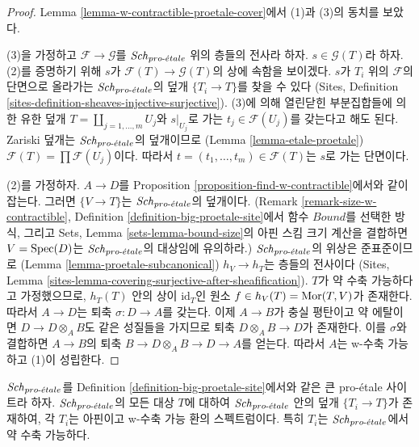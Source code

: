 \begin{proof}
Lemma \ref{lemma-w-contractible-proetale-cover}에서 (1)과 (3)의 동치를
보았다.

\medskip\noindent
(3)을 가정하고 $\mathcal{F} \to \mathcal{G}$를 $\mathit{Sch}_{pro\text{-}\acute{e}tale}$ 위의
층들의 전사라 하자. $s \in \mathcal{G}(T)$라 하자. (2)를 증명하기 위해
$s$가 $\mathcal{F}(T) \to \mathcal{G}(T)$의 상에 속함을 보이겠다.
$s$가 $T_i$ 위의 $\mathcal{F}$의 단면으로 올라가는
$\mathit{Sch}_{pro\text{-}\acute{e}tale}$의 덮개 $\{T_i \to T\}$를 찾을 수 있다
(Sites, Definition \ref{sites-definition-sheaves-injective-surjective}).
(3)에 의해 열린닫힌 부분집합들에 의한 유한 덮개
$T = \coprod_{j = 1, \ldots, m} U_j$와 $s|_{U_j}$로 가는
$t_j \in \mathcal{F}(U_j)$를 갖는다고 해도 된다.
Zariski 덮개는 $\mathit{Sch}_{pro\text{-}\acute{e}tale}$의 덮개이므로
(Lemma \ref{lemma-etale-proetale})
$\mathcal{F}(T) = \prod \mathcal{F}(U_j)$이다. 따라서
$t = (t_1, \ldots, t_m) \in \mathcal{F}(T)$는 $s$로 가는 단면이다.

\medskip\noindent
(2)를 가정하자. $A \to D$를 Proposition
\ref{proposition-find-w-contractible}에서와 같이 잡는다.
그러면 $\{V \to T\}$는 $\mathit{Sch}_{pro\text{-}\acute{e}tale}$의 덮개이다.
(Remark \ref{remark-size-w-contractible}, Definition
\ref{definition-big-proetale-site}에서 함수 $Bound$를 선택한 방식,
그리고 Sets, Lemma \ref{sets-lemma-bound-size}의 아핀 스킴 크기 계산을
결합하면 $V = \mathop{\mathrm{Spec}}(D)$는 $\mathit{Sch}_{pro\text{-}\acute{e}tale}$의 대상임에 유의하라.)
$\mathit{Sch}_{pro\text{-}\acute{e}tale}$의 위상은 준표준이므로
(Lemma \ref{lemma-proetale-subcanonical}) $h_V \to h_T$는 층들의 전사이다
(Sites, Lemma
\ref{sites-lemma-covering-surjective-after-sheafification}).
$T$가 약 수축 가능하다고 가정했으므로, $h_T(T)$ 안의 상이
$\text{id}_T$인 원소 $f \in h_V(T) = \mathop{\mathrm{Mor}}\nolimits(T, V)$가 존재한다.
따라서 $A \to D$는 퇴축 $\sigma : D \to A$를 갖는다.
이제 $A \to B$가 충실 평탄이고 약 에탈이면
$D \to D \otimes_A B$도 같은 성질들을 가지므로 퇴축
$D \otimes_A B \to D$가 존재한다. 이를 $\sigma$와 결합하면
$A \to B$의 퇴축 $B \to D \otimes_A B \to D \to A$를 얻는다.
따라서 $A$는 w-수축 가능하고 (1)이 성립한다.
\end{proof}

\begin{lemma}
\label{lemma-get-many-weakly-contractible}
$\mathit{Sch}_{pro\text{-}\acute{e}tale}$를 Definition \ref{definition-big-proetale-site}에서와
같은 큰 pro-\'etale 사이트라 하자. $\mathit{Sch}_{pro\text{-}\acute{e}tale}$의 모든 대상 $T$에
대하여 $\mathit{Sch}_{pro\text{-}\acute{e}tale}$ 안의 덮개 $\{T_i \to T\}$가 존재하여,
각 $T_i$는 아핀이고 w-수축 가능 환의 스펙트럼이다. 특히 $T_i$는
$\mathit{Sch}_{pro\text{-}\acute{e}tale}$에서 약 수축 가능하다.
\end{lemma}

